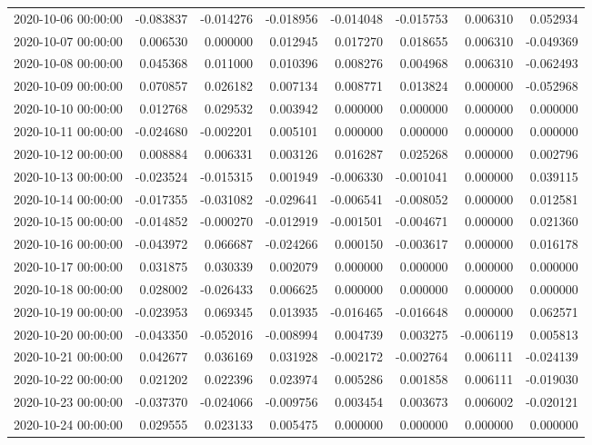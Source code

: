 \begin{tabular}{lrrrrrrr}
2020-10-06 00:00:00 & -0.083837 & -0.014276 & -0.018956 & -0.014048 & -0.015753 & 0.006310 & 0.052934 \\
2020-10-07 00:00:00 & 0.006530 & 0.000000 & 0.012945 & 0.017270 & 0.018655 & 0.006310 & -0.049369 \\
2020-10-08 00:00:00 & 0.045368 & 0.011000 & 0.010396 & 0.008276 & 0.004968 & 0.006310 & -0.062493 \\
2020-10-09 00:00:00 & 0.070857 & 0.026182 & 0.007134 & 0.008771 & 0.013824 & 0.000000 & -0.052968 \\
2020-10-10 00:00:00 & 0.012768 & 0.029532 & 0.003942 & 0.000000 & 0.000000 & 0.000000 & 0.000000 \\
2020-10-11 00:00:00 & -0.024680 & -0.002201 & 0.005101 & 0.000000 & 0.000000 & 0.000000 & 0.000000 \\
2020-10-12 00:00:00 & 0.008884 & 0.006331 & 0.003126 & 0.016287 & 0.025268 & 0.000000 & 0.002796 \\
2020-10-13 00:00:00 & -0.023524 & -0.015315 & 0.001949 & -0.006330 & -0.001041 & 0.000000 & 0.039115 \\
2020-10-14 00:00:00 & -0.017355 & -0.031082 & -0.029641 & -0.006541 & -0.008052 & 0.000000 & 0.012581 \\
2020-10-15 00:00:00 & -0.014852 & -0.000270 & -0.012919 & -0.001501 & -0.004671 & 0.000000 & 0.021360 \\
2020-10-16 00:00:00 & -0.043972 & 0.066687 & -0.024266 & 0.000150 & -0.003617 & 0.000000 & 0.016178 \\
2020-10-17 00:00:00 & 0.031875 & 0.030339 & 0.002079 & 0.000000 & 0.000000 & 0.000000 & 0.000000 \\
2020-10-18 00:00:00 & 0.028002 & -0.026433 & 0.006625 & 0.000000 & 0.000000 & 0.000000 & 0.000000 \\
2020-10-19 00:00:00 & -0.023953 & 0.069345 & 0.013935 & -0.016465 & -0.016648 & 0.000000 & 0.062571 \\
2020-10-20 00:00:00 & -0.043350 & -0.052016 & -0.008994 & 0.004739 & 0.003275 & -0.006119 & 0.005813 \\
2020-10-21 00:00:00 & 0.042677 & 0.036169 & 0.031928 & -0.002172 & -0.002764 & 0.006111 & -0.024139 \\
2020-10-22 00:00:00 & 0.021202 & 0.022396 & 0.023974 & 0.005286 & 0.001858 & 0.006111 & -0.019030 \\
2020-10-23 00:00:00 & -0.037370 & -0.024066 & -0.009756 & 0.003454 & 0.003673 & 0.006002 & -0.020121 \\
2020-10-24 00:00:00 & 0.029555 & 0.023133 & 0.005475 & 0.000000 & 0.000000 & 0.000000 & 0.000000 \\

\end{tabular}
